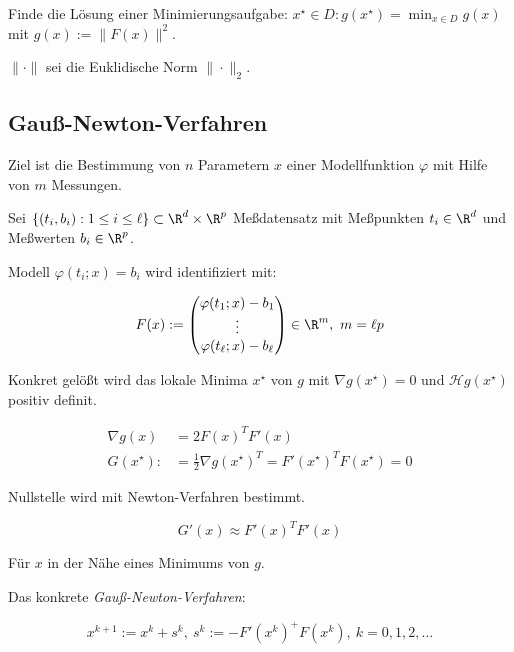 \vspace*{1mm}

Finde die Lösung einer Minimierungsaufgabe: $x^\star \in D : g(x^\star) = \min_{x \in D}g(x)$ mit $g(x) := \|F(x)\|^2$.

\vspace*{1mm}

$\|\cdot\|$ sei die Euklidische Norm $\|\cdot\|_2$.

\subsection*{Gauß-Newton-Verfahren}

Ziel ist die Bestimmung von $n$ Parametern $x$ einer Modellfunktion $\varphi$ mit Hilfe von $m$ Messungen.

Sei $\{(t_i,b_i) : 1 \leq i \leq \ell\} \subset \R^d \times \R^p$ Meßdatensatz mit Meßpunkten $t_i \in \R^d$ und Meßwerten $b_i \in \R^p$.

\columnbreak

Modell $\varphi(t_i;x) = b_i$ wird identifiziert mit:

\vspace*{-2mm}
\[ F(x) := \begin{pmatrix} \varphi(t_1;x) - b_1 \\ \vdots \\ \varphi(t_\ell;x) - b_\ell \end{pmatrix} \in \R^m, \ m=\ell p \]

Konkret gelößt wird das lokale Minima $x^\star$ von $g$ mit $\nabla g(x^\star) = 0$ und $\mathcal{H}g(x^\star)$ positiv definit.

\vspace*{-4mm}
\begin{align*}
	\nabla g(x) &= 2F(x)^T F'(x) \\
	G(x^\star) :&= \frac{1}{2} \nabla g(x^\star)^T = F'(x^\star)^T F(x^\star) = 0
\end{align*}

Nullstelle wird mit Newton-Verfahren bestimmt.

\vspace*{-2mm}
\[ G'(x) \approx F'(x)^T F'(x) \]

Für $x$ in der Nähe eines Minimums von $g$.

Das konkrete \emph{Gauß-Newton-Verfahren}:

\vspace{-4mm}
\[ x^{k+1} := x^k + s^k, \ s^k := -F'(x^k)^+ F(x^k), \ k = 0,1,2,\dots \]

